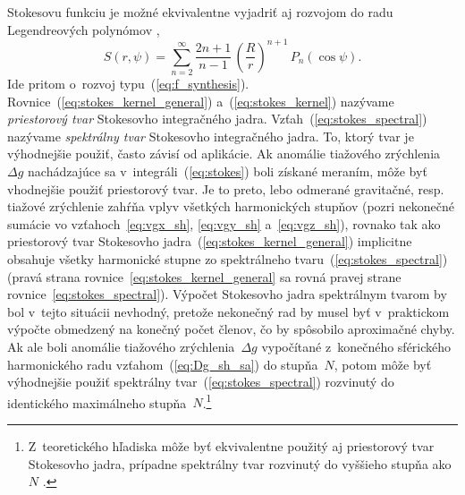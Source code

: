 \documentclass[a4paper, 12pt]{book}
\begin{document}
Stokesovu funkciu je možné ekvivalentne vyjadriť aj rozvojom do radu 
Legendreových polynómov \parencite{MoritzPhysicalGeodesy},
%
\begin{equation}
\label{eq:stokes_spectral}
S(r, \psi) = \sum_{n = 2}^{\infty} \frac{2n + 1}{n - 1} \, \left( \frac{R}{r} 
\right)^{n + 1} \, P_n(\cos\psi){.}
\end{equation}
%
Ide pritom o~rozvoj typu~(\ref{eq:f_synthesis}).  
Rovnice~(\ref{eq:stokes_kernel_general}) a~(\ref{eq:stokes_kernel}) nazývame 
\emph{priestorový tvar} Stokesovho integračného jadra.  
Vzťah~(\ref{eq:stokes_spectral}) nazývame \emph{spektrálny tvar} Stokesovho 
integračného jadra.  To, ktorý tvar je výhodnejšie použiť, často závisí od 
aplikácie.  Ak anomálie tiažového zrýchlenia~$\Delta g$ nachádzajúce sa 
v~integráli~(\ref{eq:stokes}) boli získané meraním, môže byť vhodnejšie použiť 
priestorový tvar.  Je to preto, lebo odmerané gravitačné, resp. tiažové 
zrýchlenie zahŕňa vplyv všetkých harmonických stupňov (pozri nekonečné sumácie 
vo vzťahoch~\ref{eq:vgx_sh}, \ref{eq:vgy_sh} a~\ref{eq:vgz_sh}), rovnako tak 
ako priestorový tvar Stokesovho jadra~(\ref{eq:stokes_kernel_general}) 
implicitne obsahuje všetky harmonické stupne zo spektrálneho 
tvaru~(\ref{eq:stokes_spectral}) (pravá strana 
rovnice~\ref{eq:stokes_kernel_general} sa rovná pravej strane 
rovnice~\ref{eq:stokes_spectral}).  Výpočet Stokesovho jadra spektrálnym tvarom 
by bol v~tejto situácii nevhodný, pretože nekonečný rad by musel byť 
v~praktickom výpočte obmedzený na konečný počet členov, čo by spôsobilo 
aproximačné chyby.  Ak ale boli anomálie tiažového zrýchlenia~$\Delta g$ 
vypočítané z~konečného sférického harmonického radu vzťahom~(\ref{eq:Dg_sh_sa}) 
do stupňa~$N$, potom môže byť výhodnejšie použiť spektrálny 
tvar~(\ref{eq:stokes_spectral}) rozvinutý do identického maximálneho 
stupňa~$N$.\footnote{Z~teoretického hľadiska môže byť ekvivalentne použitý aj 
priestorový tvar Stokesovho jadra, prípadne spektrálny tvar rozvinutý do 
vyššieho stupňa ako~$N$ \parencite[pozri napríklad][]{Freeden2009}.}
\end{document}
